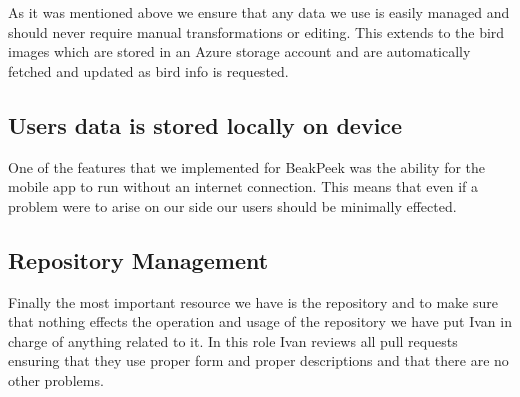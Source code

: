 \documentclass[a4paper]{article}
\begin{document}
As it was mentioned above we ensure that any data we use is easily managed and should never require 
manual transformations or editing. This extends to the bird images which are stored in an Azure 
storage account and are automatically fetched and updated as bird info is requested.

\subsection{Users data is stored locally on device}

One of the features that we implemented for BeakPeek was the ability for the mobile app to run 
without an internet connection. This means that even if a problem were to arise on our side our 
users should be minimally effected.

\subsection{Repository Management}

Finally the most important resource we have is the repository and to make sure that nothing 
effects the operation and usage of the repository we have put Ivan in charge of anything related 
to it. In this role Ivan reviews all pull requests ensuring that they use proper form and 
proper descriptions and that there are no other problems.
\end{document}

